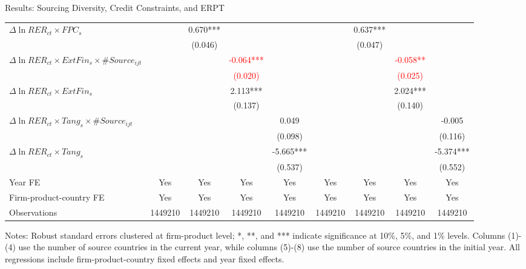 \documentclass[10pt]{beamer}
\begin{document}
\begin{frame}{Results: Sourcing Diversity, Credit Constraints, and ERPT}
\begin{table}[htbp]
{\begin{threeparttable}
\begin{tabular}{lcccccccc}
			$\Delta \ln RER_{ct} \times FPC_{s}$ &  & 0.670*** &       &       &       & 0.637*** &       &  \\
			&   & (0.046) &       &       &       & (0.047) &       &  \\
			$\Delta \ln RER_{ct} \times ExtFin_{s} \times \#Source_{ijt}$ &   &       & \textcolor{red}{-0.064***} &       &       &       & \textcolor{red}{-0.058**} &  \\
			&   &       & \textcolor{red}{(0.020)} &       &       &       & \textcolor{red}{(0.025)} &  \\
			$\Delta \ln RER_{ct} \times ExtFin_{s}$ &     &       & 2.113*** &       &       &       & 2.024*** &  \\
			&   &       & (0.137) &       &       &       & (0.140) &  \\
			$\Delta \ln RER_{ct} \times Tang_{s} \times \#Source_{ijt}$ &    &       &       & 0.049 &       &       &       & -0.005 \\
			&    &       &       & (0.098) &       &       &       & (0.116) \\
			$\Delta \ln RER_{ct} \times Tang_{s}$ &   &       &       & -5.665*** &       &       &       & -5.374*** \\
			&  &       &       & (0.537) &       &       &       & (0.552) \\
                \midrule
			Year FE  & Yes   & Yes   & Yes   & Yes & Yes   & Yes   & Yes   & Yes\\
			Firm-product-country FE & Yes   & Yes   & Yes   & Yes & Yes   & Yes   & Yes   & Yes\\
			Observations & 1449210 & 1449210 & 1449210 & 1449210 & 1449210 & 1449210 & 1449210 & 1449210\\
			\bottomrule
		\end{tabular}
		\begin{tablenotes}
			\footnotesize
			\item Notes: Robust standard errors clustered at firm-product level; *, **, and *** indicate significance at 10\%, 5\%, and 1\% levels. Columns (1)-(4) use the number of source countries in the current year, while columns (5)-(8) use the number of source countries in the initial year. All regressions include firm-product-country fixed effects and year fixed effects.
		\end{tablenotes}
	\end{threeparttable}
	}
	\label{tab.source}
    \end{table}
    \hyperlink{tab.source.distance}{}
\end{frame}
\end{document}
